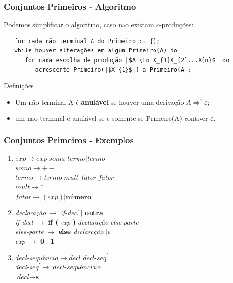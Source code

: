 \documentclass[table]{beamer}
\begin{document}
\begin{frame}[fragile]
   \frametitle{Conjuntos Primeiros - Algoritmo}
   Podemos simplificar o algoritmo, caso não existam $\varepsilon$-produções:
   \begin{verbatim}
   for cada não terminal A do Primeiro := {};
   while houver alterações em algum Primeiro(A) do
      for cada escolha de produção |$A \to X_{1}X_{2}...X{n}$| do
         acrescente Primeiro(|$X_{1}$|) a Primeiro(A);
   \end{verbatim}
   \begin{block}{Definições}
   \begin{itemize}
      \item Um não terminal A é \textbf{anulável} se houver uma derivação $A{\Rightarrow}^{*}\varepsilon$;
      \item um não terminal é anulável se e somente se Primeiro(A) contiver $\varepsilon$.
   \end{itemize}
   \end{block}
\end{frame}

\begin{frame}
   \frametitle{Conjuntos Primeiros - Exemplos}
   \begin{enumerate}
      \item $\textit{exp} \to \textit{exp soma termo} | \textit{termo}$ \\
            $\textit{soma} \to +|-$ \\
            $\textit{termo} \to \textit{termo mult fator} | \textit{fator}$ \\
            $\textit{mult} \to *$ \\
            $\textit{fator} \to (\textit{exp}) | \textbf{número}$
  
      \item \textit{declaração} $\to$ \textit{if-decl} $|$ \textbf{outra} \\
            \textit{if-decl} $\to$ \textbf{if (} \textit{exp} \textbf{)} \textit{declaração} \textit{else-parte} \\ 
            \textit{else-parte} $\to$ \textbf{else} \textit{declaração} $| \varepsilon$ \\
            \textit{exp} $\to$ \textbf{0} $|$ \textbf{1}

      \item $\textit{decl-sequência} \to decl \textit{ decl-seq}^{'}$ \\
            $\textit{decl-seq}^{'} \to \textbf{;} \textit{decl-sequência} | \varepsilon$ \\
	    $\textit{decl} \to \textbf{s}$
   \end{enumerate}
\end{frame}
\end{document}
